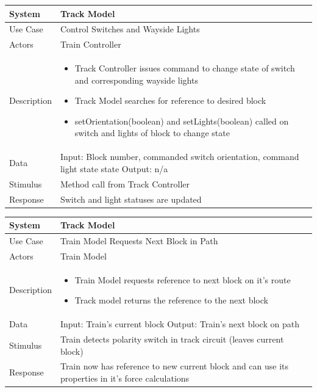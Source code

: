 \documentclass{article}
\begin{document}
    \begin{longtable}{
    || >{\raggedright\arraybackslash}m{}
    | >{\raggedright\arraybackslash}m{}||}
    \hline
    \textbf{System} & \textbf{Track Model} \\
    \hline
    Use Case & Control Switches and Wayside Lights\\
    \hline
    Actors & Train Controller\\
    \hline
    Description & \begin{itemize}
        \item Track Controller issues command to change state of switch and corresponding wayside lights
        \item Track Model searches for reference to desired block
        \item setOrientation(boolean) and setLights(boolean) called on switch and lights of block to change state
    \end{itemize}\\
    \hline
    Data & Input: Block number, commanded switch orientation, command light state state \newline Output: n/a\\
    \hline
    Stimulus & Method call from Track Controller\\
    \hline
    Response & Switch and light statuses are updated\\
    \hline
    \end{longtable}
    
    \begin{longtable}{
    || >{\raggedright\arraybackslash}m{}
    | >{\raggedright\arraybackslash}m{}||}
    \hline
    \textbf{System} & \textbf{Track Model} \\
    \hline
    Use Case & Train Model Requests Next Block in Path\\
    \hline
    Actors & Train Model\\
    \hline
    Description & \begin{itemize}
        \item Train Model requests reference to next block on it's route
        \item Track model returns the reference to the next block
    \end{itemize}\\
    \hline
    Data & Input: Train's current block \newline Output: Train's next block on path\\
    \hline
    Stimulus & Train detects polarity switch in track circuit (leaves current block)\\
    \hline
    Response & Train now has reference to new current block and can use its properties in it's force calculations\\
    \hline
    \end{longtable}
    
\end{document}
